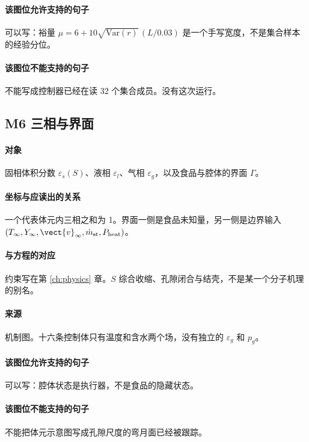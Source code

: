 \paragraph{该图位允许支持的句子}
可以写：裕量 $\mu=6+10\sqrt{\mathrm{Var}(r)}\,(L/0.03)$ 是一个手写宽度，不是集合样本的经验分位。

\paragraph{该图位不能支持的句子}
不能写成控制器已经在读 32 个集合成员。没有这次运行。

\subsection{M6 三相与界面}
\paragraph{对象}
固相体积分数 $\varepsilon_s(S)$、液相 $\varepsilon_l$、气相 $\varepsilon_g$，以及食品与腔体的界面 $\Gamma$。

\paragraph{坐标与应读出的关系}
一个代表体元内三相之和为 1。界面一侧是食品未知量，另一侧是边界输入 $(T_\infty,Y_\infty,\vect{v}_\infty,\dot m_{\mathrm{st}},P_{\mathrm{heat}})$。

\paragraph{与方程的对应}
约束写在第 \ref{ch:physics} 章。$S$ 综合收缩、孔隙闭合与结壳，不是某一个分子机理的别名。

\paragraph{来源}
机制图。十六条控制体只有温度和含水两个场，没有独立的 $\varepsilon_g$ 和 $p_g$。

\paragraph{该图位允许支持的句子}
可以写：腔体状态是执行器，不是食品的隐藏状态。

\paragraph{该图位不能支持的句子}
不能把体元示意图写成孔隙尺度的弯月面已经被跟踪。

